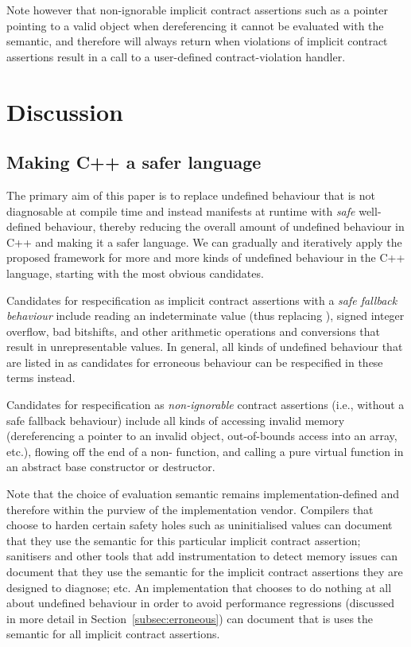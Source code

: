 Note however that non-ignorable implicit contract assertions such as a pointer pointing to a valid object when dereferencing it cannot be evaluated with the  semantic, and therefore  will always return  when violations of implicit contract assertions result in a call to a user-defined contract-violation handler.

\section{Discussion}

\subsection{Making C++ a safer language}

The primary aim of this paper is to replace undefined behaviour that is not diagnosable at compile time and instead manifests at runtime with \emph{safe} well-defined behaviour, thereby reducing the overall amount of undefined behaviour in C++ and making it a safer language. We can gradually and iteratively apply the proposed framework for more and more kinds of undefined behaviour in the C++ language, starting with the most obvious candidates.

Candidates for respecification as implicit contract assertions with a \emph{safe fallback behaviour} include reading an indeterminate value (thus replacing \cite{P2795R5}), signed integer overflow, bad bitshifts, and other arithmetic operations and conversions that result in unrepresentable values. In general, all kinds of undefined behaviour that are listed in \cite{P2795R5} as candidates for erroneous behaviour can be respecified in these terms instead.

Candidates for respecification as \emph{non-ignorable} contract assertions (i.e., without a safe fallback behaviour) include all kinds of accessing invalid memory (dereferencing a pointer to an invalid object, out-of-bounds access into an array, etc.), flowing off the end of a non- function, and calling a pure virtual function in an abstract base constructor or destructor.

Note that the choice of evaluation semantic remains implementation-defined and therefore within the purview of the implementation vendor. Compilers that choose to harden certain safety holes such as uninitialised values can document that they use the  semantic for this particular implicit contract assertion; sanitisers and other tools that add instrumentation to detect memory issues can document that they use the  semantic for the implicit contract assertions they are designed to diagnose; etc. An implementation that chooses to do nothing at all about undefined behaviour in order to avoid performance regressions (discussed in more detail in Section~\ref{subsec:erroneous}) can document that is uses the  semantic for all implicit contract assertions.

